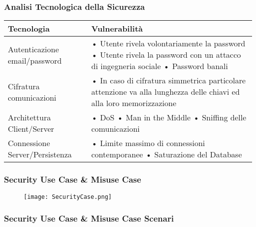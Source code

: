 \subsubsection{Analisi Tecnologica della Sicurezza}

\begin{tabular} {|P{4cm}|P{12cm}|}
  \hline
  Tecnologia                     & Vulnerabilità                                            \\
  \hline
  Autenticazione email/password  & • Utente rivela volontariamente la password \linebreak
  • Utente rivela la password con un attacco di ingegneria sociale \linebreak
  • Password banali                                                                         \\
  \hline
  Cifratura comunicazioni        & • In caso di cifratura simmetrica particolare
  attenzione va alla lunghezza delle chiavi ed alla loro memorizzazione                     \\
  \hline
  Architettura Client/Server     & • DoS \linebreak
  • Man in the Middle \linebreak
  • Sniffing delle comunicazioni                                                            \\
  \hline
  Connessione Server/Persistenza & • Limite massimo di connessioni contemporanee \linebreak
  • Saturazione del Database                                                                \\
  \hline
\end{tabular}

\newpage
\subsubsection{Security Use Case \& Misuse Case}
\par

\begin{figure}[h!]
  \begin{center}
    \texttt{[image: SecurityCase.png]}
  \end{center}
\end{figure}
\newpage


\subsubsection{Security Use Case \& Misuse Case Scenari}
\hfill

